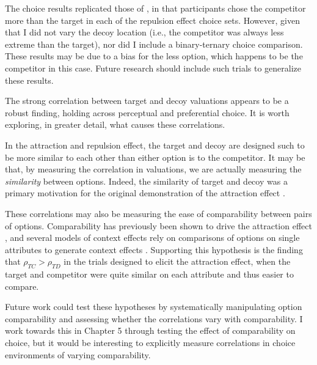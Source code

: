 The choice results replicated those of \textcite{banerjeeFactorsThatPromote2024}, in that participants chose the competitor more than the target in each of the repulsion effect choice sets. However, given that I did not vary the decoy location (i.e., the competitor was always less extreme than the target), nor did I include a binary-ternary choice comparison. These results may be due to a bias for the less option, which happens to be the competitor in this case. Future research should include such trials to generalize these results.

The strong correlation between target and decoy valuations appears to be a robust finding, holding across perceptual and preferential choice. It is worth exploring, in greater detail, what causes these correlations. 

In the attraction and repulsion effect, the target and decoy are designed such to be more similar to each other than either option is to the competitor. It may be that, by measuring the correlation in valuations, we are actually measuring the \textit{similarity} between options. Indeed, the similarity of target and decoy was a primary motivation for the original demonstration of the attraction effect \parencite{huberAddingAsymmetricallyDominated1982d}. 

These correlations may also be measuring the ease of comparability between pairs of options. Comparability has previously been shown to drive the attraction effect \parencite{noguchi2014attraction,cataldoComparisonProcessAccount2019b}, and several models of context effects rely on comparisons of options on single attributes to generate context effects \parencite{trueblood2014multiattribute,roeMultialternativeDecisionField2001a}. Supporting this hypothesis is the finding that $\rho_{TC}>\rho_{TD}$ in the trials designed to elicit the attraction effect, when the target and competitor were quite similar on each attribute and thus easier to compare.

Future work could test these hypotheses by systematically manipulating option comparability and assessing whether the correlations vary with comparability. I work towards this in Chapter 5 through testing the effect of comparability on choice, but it would be interesting to explicitly measure correlations in choice environments of varying comparability. 
